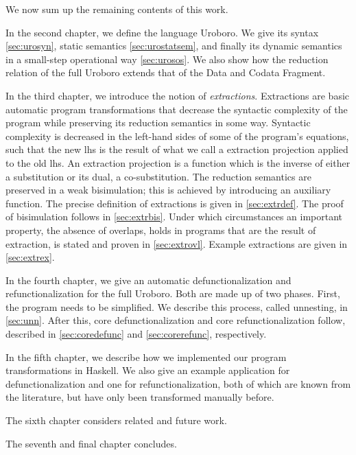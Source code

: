 We now sum up the remaining contents of this work.

In the second chapter, we define the language Uroboro. We give its syntax \autoref{sec:urosyn}, static semantics \autoref{sec:urostatsem}, and finally its dynamic semantics in a small-step operational way \autoref{sec:urosos}. We also show how the reduction relation of the full Uroboro extends that of the Data and Codata Fragment.

In the third chapter, we introduce the notion of \textit{extractions}. Extractions are basic automatic program transformations that decrease the syntactic complexity of the program while preserving its reduction semantics in some way. Syntactic complexity is decreased in the left-hand sides of some of the program's equations, such that the new lhs is the result of what we call a extraction projection applied to the old lhs. An extraction projection is a function which is the inverse of either a substitution or its dual, a co-substitution. The reduction semantics are preserved in a weak bisimulation; this is achieved by introducing an auxiliary function. The precise definition of extractions is given in \autoref{sec:extrdef}. The proof of bisimulation follows in \autoref{sec:extrbis}. Under which circumstances an important property, the absence of overlaps, holds in programs that are the result of extraction, is stated and proven in \autoref{sec:extrovl}. Example extractions are given in \autoref{sec:extrex}.

In the fourth chapter, we give an automatic defunctionalization and refunctionalization for the full Uroboro. Both are made up of two phases. First, the program needs to be simplified. We describe this process, called unnesting, in \autoref{sec:unn}. After this, core defunctionalization and core refunctionalization follow, described in \autoref{sec:coredefunc} and \autoref{sec:corerefunc}, respectively.

In the fifth chapter, we describe how we implemented our program transformations in Haskell. We also give an example application for defunctionalization and one for refunctionalization, both of which are known from the literature, but have only been transformed manually before.

The sixth chapter considers related and future work.

The seventh and final chapter concludes.
